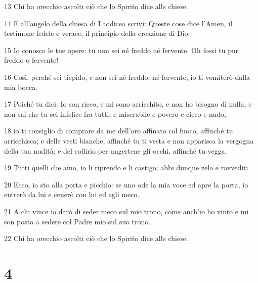 \par 13 Chi ha orecchio ascolti ciò che lo Spirito dice alle chiese.
\par 14 E all'angelo della chiesa di Laodicea scrivi: Queste cose dice l'Amen, il testimone fedele e verace, il principio della creazione di Dio:
\par 15 Io conosco le tue opere: tu non sei né freddo né fervente. Oh fossi tu pur freddo o fervente!
\par 16 Così, perché sei tiepido, e non sei né freddo, né fervente, io ti vomiterò dalla mia bocca.
\par 17 Poiché tu dici: Io son ricco, e mi sono arricchito, e non ho bisogno di nulla, e non sai che tu sei infelice fra tutti, e miserabile e povero e cieco e nudo,
\par 18 io ti consiglio di comprare da me dell'oro affinato col fuoco, affinché tu arricchisca; e delle vesti bianche, affinché tu ti vesta e non apparisca la vergogna della tua nudità; e del collirio per ungertene gli occhi, affinché tu vegga.
\par 19 Tutti quelli che amo, io li riprendo e li castigo; abbi dunque zelo e ravvediti.
\par 20 Ecco, io sto alla porta e picchio: se uno ode la mia voce ed apre la porta, io entrerò da lui e cenerò con lui ed egli meco.
\par 21 A chi vince io darò di seder meco sul mio trono, come anch'io ho vinto e mi son posto a sedere col Padre mio sul suo trono.
\par 22 Chi ha orecchio ascolti ciò che lo Spirito dice alle chiese.

\chapter{4}

